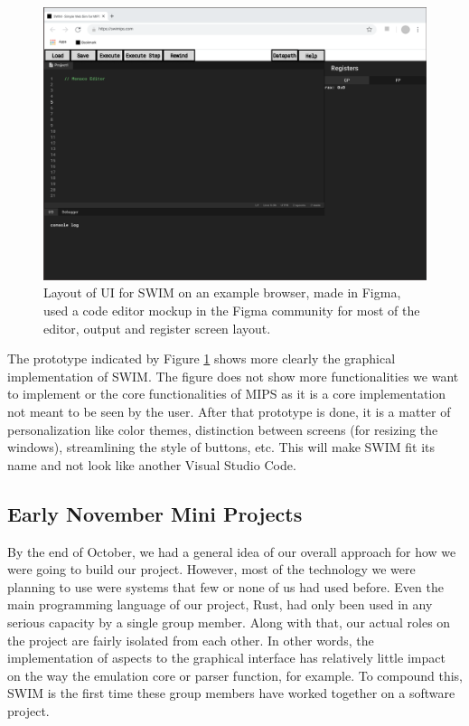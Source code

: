 \documentclass[
    paper=letter,
    parskip=half,
    fontsize=12pt,
    titlepage=firstiscover,
    toc=bibliography,
    numbers=endperiod
]{scrartcl}
\begin{document}
\begin{figure}[H]
    \includegraphics[width=\textwidth]{new-ui-prototype}
    \caption{Layout of UI for SWIM on an example browser, made in Figma, used a code editor mockup in the Figma community for most of the editor, output and register screen layout.}
    \label{fig:new-ui-prototype}
\end{figure}


The prototype indicated by Figure \ref{fig:new-ui-prototype} shows more
clearly the graphical implementation of SWIM. The figure does not show
more functionalities we want to implement or the core functionalities of
MIPS as it is a core implementation not meant to be seen by the user.
After that prototype is done, it is a matter of personalization like
color themes, distinction between screens (for resizing the windows),
streamlining the style of buttons, etc. This will make SWIM fit its name
and not look like another Visual Studio Code.

\subsection{Early November Mini Projects}

By the end of October, we had a general idea of our overall approach for
how we were going to build our project. However, most of the technology
we were planning to use were systems that few or none of us had used
before. Even the main programming language of our project, Rust, had
only been used in any serious capacity by a single group member. Along
with that, our actual roles on the project are fairly isolated from each
other. In other words, the implementation of aspects to the graphical
interface has relatively little impact on the way the emulation core or
parser function, for example. To compound this, SWIM is the first time
these group members have worked together on a software project.
\end{document}
